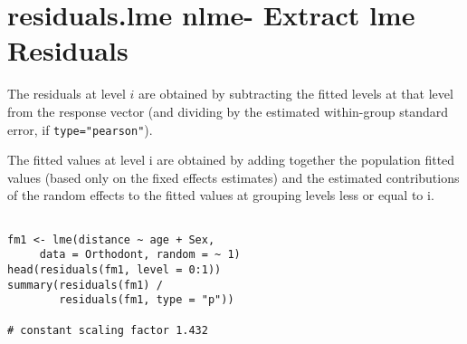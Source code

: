 \documentclass[residuals.tex]{subfiles}
\begin{document}
\section{residuals.lme {nlme}- Extract lme Residuals}

The residuals at level $i$ are obtained by subtracting the fitted levels at that level from the response vector (and dividing by the estimated within-group standard error, if \texttt{type="pearson"}). 

The fitted values at level i are obtained by adding together the population fitted values (based only on the fixed effects estimates) and the estimated contributions of the random effects to the fitted values at grouping levels less or equal to i.
 
 
\begin{framed}
\begin{verbatim}

fm1 <- lme(distance ~ age + Sex, 
     data = Orthodont, random = ~ 1)
head(residuals(fm1, level = 0:1))
summary(residuals(fm1) /
        residuals(fm1, type = "p")) 
        
# constant scaling factor 1.432

\end{verbatim}
\end{framed}
\end{document}
